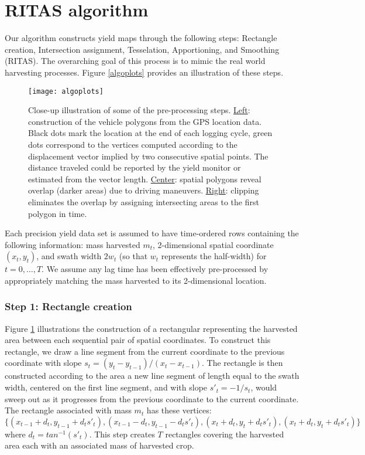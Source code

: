 \section{RITAS algorithm}

Our algorithm constructs yield maps through the following steps:
Rectangle creation, Intersection assignment, Tesselation,
Apportioning, and Smoothing (RITAS). The overarching goal of this
process is to mimic the real world harvesting processes. Figure
\ref{algoplots} provides an illustration of these steps.

\begin{figure}[h!]  \centering
\texttt{[image: algoplots]}
    \caption{Close-up illustration of some of the pre-processing
steps. \underline{Left}: construction of the vehicle polygons from the
GPS location data. Black dots mark the location at the end of each
logging cycle, green dots correspond to the vertices computed
according to the displacement vector implied by two consecutive
spatial points. The distance traveled could be reported by the yield
monitor or estimated from the vector length. \underline{Center}:
spatial polygons reveal overlap (darker areas) due to driving
maneuvers. \underline{Right}: clipping eliminates the overlap by
assigning intersecting areas to the first polygon in time.}
    \label{fig:closeup}
\end{figure} 

Each precision yield data set is assumed to have time-ordered rows
containing the following information: mass harvested $m_t$,
2-dimensional spatial coordinate $(x_t,y_t)$, and swath width $2w_t$
(so that $w_t$ represents the half-width) for $t=0,\ldots,T$.  We
assume any lag time has been effectively pre-processed by
appropriately matching the mass harvested to its 2-dimensional
location.  

\subsubsection*{Step 1: Rectangle creation}

Figure \ref{} illustrations the construction of a rectangular
representing the harvested area between each sequential pair of
spatial coordinates. To construct this rectangle, we draw a line
segment from the current coordinate to the previous coordinate with
slope $s_t = (y_t-y_{t-1})/(x_t-x_{t-1})$.  The rectangle is then
constructed according to the area a new line segment of length equal
to the swath width, centered on the first line segment, and with slope
$s'_t = -1/s_t$, would sweep out as it progresses from the previous
coordinate to the current coordinate.  The rectangle associated with
mass $m_t$ has these vertices: $\{(x_{t-1} + d_t, y_{t-1} +
d_ts'_t),(x_{t-1} - d_t, y_{t-1} - d_ts'_t), (x_{t } + d_t, y_{t } +
d_ts'_t),(x_{t } + d_t, y_{t } + d_ts'_t)\}$ where $d_t =
tan^{-1}(s'_t)$.  This step creates $T$ rectangles covering the
harvested area each with an associated mass of harvested crop.

